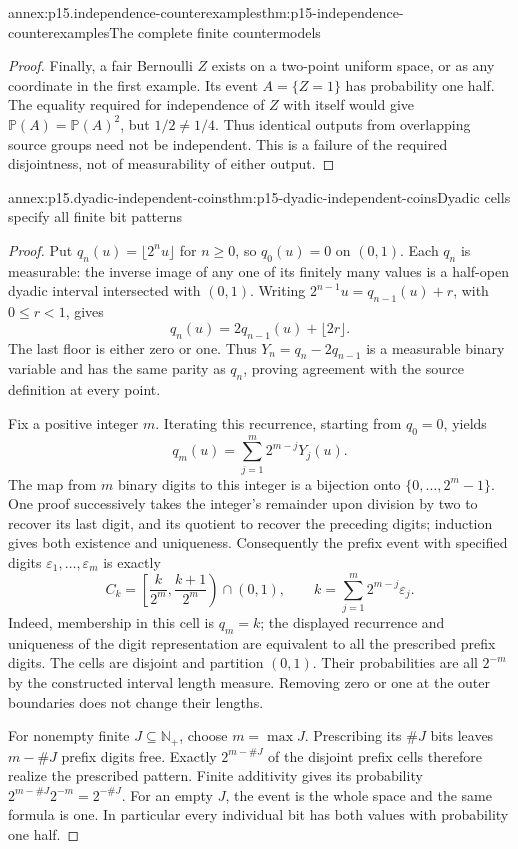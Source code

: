 \begin{annexitem}{annex:p15.independence-counterexamples}{thm:p15-independence-counterexamples}{The complete finite countermodels}
\begin{proof}
Finally, a fair Bernoulli \(Z\) exists on a two-point uniform
space, or as any coordinate in the first example. Its event
\(A=\{Z=1\}\) has probability one half. The equality required
for independence of \(Z\) with itself would give
\(\mathbb P(A)=\mathbb P(A)^2\), but \(1/2\ne1/4\).
Thus identical outputs from overlapping source groups need not be
independent. This is a failure of the required disjointness, not of
measurability of either output.
\end{proof}
\end{annexitem}

\begin{annexitem}{annex:p15.dyadic-independent-coins}{thm:p15-dyadic-independent-coins}{Dyadic cells specify all finite bit patterns}
\begin{proof}
Put \(q_n(u)=\lfloor2^nu\rfloor\) for \(n\geq0\), so
\(q_0(u)=0\) on \((0,1)\). Each \(q_n\) is measurable:
the inverse image of any one of its finitely many values is a
half-open dyadic interval intersected with \((0,1)\).
Writing \(2^{n-1}u=q_{n-1}(u)+r\), with \(0\leq r<1\),
gives
\[
 q_n(u)=2q_{n-1}(u)+\lfloor2r\rfloor.
\]
The last floor is either zero or one. Thus
\(Y_n=q_n-2q_{n-1}\) is a measurable binary variable and has
the same parity as \(q_n\), proving agreement with the source
definition at every point.

Fix a positive integer \(m\). Iterating this recurrence, starting
from \(q_0=0\), yields
\[
 q_m(u)=\sum_{j=1}^m2^{m-j}Y_j(u).
\]
The map from \(m\) binary digits to this integer is a bijection
onto \(\{0,\ldots,2^m-1\}\). One proof successively takes
the integer's remainder upon division by two to recover its last
digit, and its quotient to recover the preceding digits; induction
gives both existence and uniqueness. Consequently the prefix event
with specified digits \(\varepsilon_1,\ldots,\varepsilon_m\)
is exactly
\[
 C_k=\left[\frac{k}{2^m},\frac{k+1}{2^m}\right)\cap(0,1),
 \qquad k=\sum_{j=1}^m2^{m-j}\varepsilon_j.
\]
Indeed, membership in this cell is \(q_m=k\); the displayed
recurrence and uniqueness of the digit representation are equivalent
to all the prescribed prefix digits. The cells are disjoint and
partition \((0,1)\). Their probabilities are all \(2^{-m}\)
by the constructed interval length measure. Removing zero or one
at the outer boundaries does not change their lengths.

For nonempty finite \(J\subseteq\mathbb N_+\), choose
\(m=\max J\). Prescribing its \(\#J\) bits leaves
\(m-\#J\) prefix digits free. Exactly \(2^{m-\#J}\)
of the disjoint prefix cells therefore realize the prescribed
pattern. Finite additivity gives its probability
\(2^{m-\#J}2^{-m}=2^{-\#J}\). For an empty \(J\),
the event is the whole space and the same formula is one.
In particular every individual bit has both values with probability
one half.


\end{proof}
\end{annexitem}
